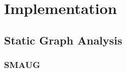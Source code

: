 
\chapter{Implementation} %

\label{Chapter5} %
\section{Static Graph Analysis}
\subsection{SMAUG}

